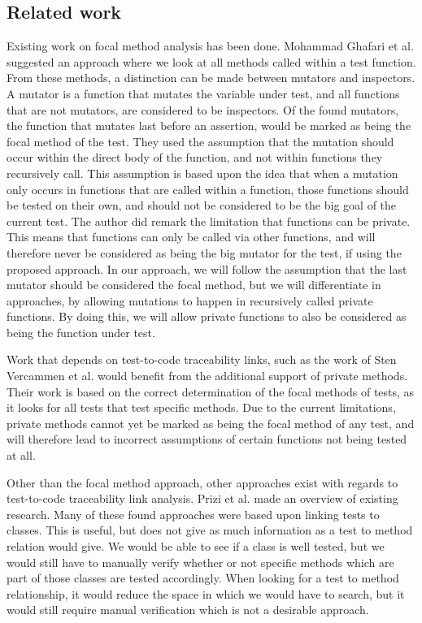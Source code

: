 \documentclass[11pt]{article}
\begin{document}
\begin{multicols}{2}
\section{Related work}
Existing work on focal method analysis has been done. Mohammad Ghafari et al.\cite{ghafari2015automatically} suggested an approach where we look at all methods called within a test function. From these methods, a distinction can be made between mutators and inspectors. A mutator is a function that mutates the variable under test, and all functions that are not mutators, are considered to be inspectors. Of the found mutators, the function that mutates last before an assertion, would be marked as being the focal method of the test. They used the assumption that the mutation should occur within the direct body of the function, and not within functions they recursively call. This assumption is based upon the idea that when a mutation only occurs in functions that are called within a function, those functions should be tested on their own, and should not be considered to be the big goal of the current test. The author did remark the limitation that functions can be private. This means that functions can only be called via other functions, and will therefore never be considered as being the big mutator for the test, if using the proposed approach. In our approach, we will follow the assumption that the last mutator should be considered the focal method, but we will differentiate in approaches, by allowing mutations to happen in recursively called private functions. By doing this, we will allow private functions to also be considered as being the function under test.

Work that depends on test-to-code traceability links, such as the work of Sten Vercammen et al. \cite{10.1145/3278186.3278190} would benefit from the additional support of private methods. Their work is based on the correct determination of the focal methods of tests, as it looks for all tests that test specific methods. Due to the current limitations, private methods cannot yet be marked as being the focal method of any test, and will therefore lead to incorrect assumptions of certain functions not being tested at all.

Other than the focal method approach, other approaches exist with regards to test-to-code traceability link analysis. Prizi et al. \cite{6862933} made an overview of existing research. Many of these found approaches \cite{10.1007/978-3-030-24305-0_40, 8823709, 6080780, 8452876, qusef2014recovering, van2009establishing} were based upon linking tests to classes. This is useful, but does not give as much information as a test to method relation would give. We would be able to see if a class is well tested, but we would still have to manually verify whether or not specific methods which are part of those classes are tested accordingly. When looking for a test to method relationship, it would reduce the space in which we would have to search, but it would still require manual verification which is not a desirable approach.


\end{multicols}
\end{document}
